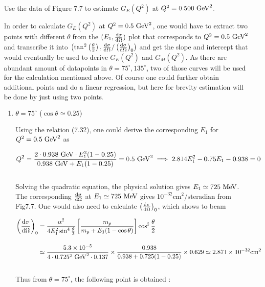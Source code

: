 \begin{problem}{7.7}
    Use the data of Figure 7.7 to estimate $G_E (Q^2 )$ at $Q^2 = 0.500 \text{ GeV}^2 $.
\end{problem}
\begin{solution}
In order to calculate $G_E(Q^2)$ at $Q^2 = 0.5 \text{ GeV}^2$, one would have to extract two points with different $\theta$ from the $(E_1,\frac{\mathop{}\!\mathrm{d}\sigma}{\mathop{}\!\mathrm{d}\Omega})$ plot that corresponds to $Q^2 = 0.5 \text{ GeV}^2$ and transcribe it into $\left(\tan^2\left(\frac{\theta}{2}\right),\frac{\mathop{}\!\mathrm{d}\sigma}{\mathop{}\!\mathrm{d}\Omega}/\left(\frac{\mathop{}\!\mathrm{d}\sigma}{\mathop{}\!\mathrm{d}\Omega}\right)_0\right)$ and get the slope and intercept that would eventually be used to derive $G_E(Q^2)$ and $G_M(Q^2)$. As there are abundant amount of datapoints in $\theta=75^\circ,135^\circ$, two of those curves will be used for the calculation mentioned above. Of course one could further obtain additional points and do a linear regression, but here for brevity estimation will be done by just using two points. 

\begin{enumerate}[label=(\alph*)]
    \item $\theta=75^\circ$ ($\cos\theta \simeq 0.25$)
    
        Using the relation (7.32), one could derive the corresponding $E_1$ for $Q^2=0.5\text{ GeV}^2$ as  

        \begin{align*}
            Q^2 = \frac{2 \cdot 0.938 \text{ GeV} \cdot E_1^2 (1-0.25)}{0.938 \text{ GeV} +E_1(1-0.25)} = 0.5 \text{ GeV}^2 \implies 2.814E_1^2 - 0.75E_1 -0.938 = 0  
        \end{align*}\\
        Solving the quadratic equation, the physical solution gives $E_1 \simeq 725 \text{ MeV}$. The corresponding $\frac{\mathop{}\!\mathrm{d}\sigma}{\mathop{}\!\mathrm{d}\Omega}$ at $E_1 \simeq 725 \text{ MeV}$ gives $10^{-32} \text{cm}^2/\text{steradian}$ from Fig7.7. One would also need to calculate $\left( \frac{\mathop{}\!\mathrm{d}\sigma}{\mathop{}\!\mathrm{d}\Omega} \right)_0$, which shows to beam

        \begin{align*}
            \left( \frac{\dif\sigma}{\dif\Omega} \right)_0 &= \frac{\alpha^2}{4E_1^2\sin^4\frac{\theta}{2}}\left[ \frac{m_p}{m_p+E_1(1-\cos\theta)} \right] \cos^2\frac{\theta}{2} \\[0.15in]
            &\simeq \frac{\num{5.3e-5}}{4\cdot0.725^2 \GeV^2 \cdot 0.137} \times \frac{0.938  }{0.938  + 0.725 (1-0.25)} \times 0.629 \simeq \num{2.871e-32} \unit{cm}^2
        \end{align*}\\
        Thus from $\theta=75^\circ$, the following point is obtained :


\end{enumerate}
\end{solution}
